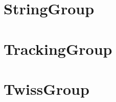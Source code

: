 \section{StringGroup}
\label{s:string.g}

\section{TrackingGroup}
\label{s:tracking.g}

\section{TwissGroup}
\label{s:twiss.g}

